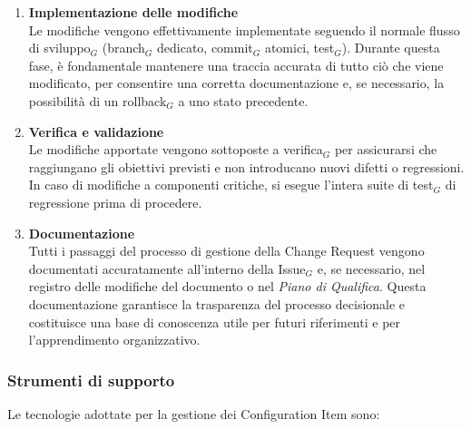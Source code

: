 \documentclass[a4paper, 10pt]{article}
\begin{document}
\begin{enumerate}
    \item \textbf{Implementazione delle modifiche}\\
    Le modifiche vengono effettivamente implementate seguendo il normale flusso di sviluppo$_G$ (branch$_G$ dedicato, commit$_G$ atomici, test$_G$). Durante questa fase, è fondamentale mantenere una traccia accurata di tutto ciò che viene modificato, per consentire una corretta documentazione e, se necessario, la possibilità di un rollback$_G$ a uno stato precedente.
    
    \item \textbf{Verifica e validazione}\\
    Le modifiche apportate vengono sottoposte a verifica$_G$ per assicurarsi che raggiungano gli obiettivi previsti e non introducano nuovi difetti o regressioni. In caso di modifiche a componenti critiche, si esegue l'intera suite di test$_G$ di regressione prima di procedere.
    
    \item \textbf{Documentazione}\\
    Tutti i passaggi del processo di gestione della Change Request vengono documentati accuratamente all'interno della Issue$_G$ e, se necessario, nel registro delle modifiche del documento o nel \emph{Piano di Qualifica}. Questa documentazione garantisce la trasparenza del processo decisionale e costituisce una base di conoscenza utile per futuri riferimenti e per l'apprendimento organizzativo.
\end{enumerate}

\subsubsection{Strumenti di supporto}
\label{subsubsec:strumenti_configurazione}

Le tecnologie adottate per la gestione dei Configuration Item sono:
\end{document}
